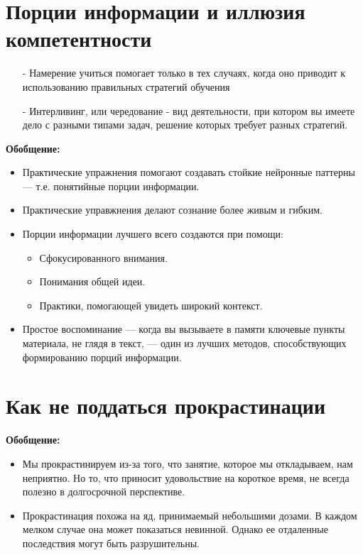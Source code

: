 \documentclass{article}
\begin{document}
\section{Порции информации и иллюзия компетентности}
\begin{itemize}
\item[-] Намерение учиться помогает только в тех случаях, когда оно приводит к использованию правильных стратегий обучения
\item[-] Интерливинг, или чередование - вид деятельности, при котором вы имеете дело с разными типами задач, решение которых требует разных стратегий.
\end{itemize}
\textbf{Обобщение:}
\begin{itemize}
\item Практические упражнения помогают создавать стойкие нейронные паттерны --- т.е. понятийные порции информации.
\item Практические управжнения делают сознание более живым и гибким.
\item Порции информации лучшего всего создаются при помощи:
\begin{itemize}
\item Сфокусированного внимания.
\item Понимания общей идеи.
\item Практики, помогающей увидеть широкий контекст.
\end{itemize}
\item Простое воспоминание --- когда вы вызываете в памяти ключевые пункты материала, не глядя в текст, --- один из лучших методов, способствующих формированию порций информации.
\end{itemize}

\section{Как не поддаться прокрастинации}
\textbf{Обобщение:}
\begin{itemize}
\item Мы прокрастинируем из-за того, что занятие, которое мы откладываем, нам неприятно. Но то, что приносит удовольствие на короткое время, не всегда полезно в долгосрочной перспективе.
\item Прокрастинация похожа на яд, принимаемый небольшими дозами. В каждом мелком случае она может показаться невинной. Однако ее отдаленные последствия могут быть разрушительны.
\end{itemize}
\end{document}
